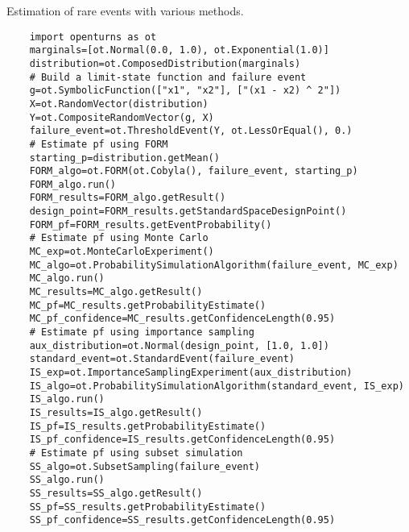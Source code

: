 \begin{otexample_apx}
    Estimation of rare events with various methods. 
    \lstset{style=mystyle, language=python}
%
\begin{lstlisting}
    import openturns as ot
    marginals=[ot.Normal(0.0, 1.0), ot.Exponential(1.0)]
    distribution=ot.ComposedDistribution(marginals)
    # Build a limit-state function and failure event
    g=ot.SymbolicFunction(["x1", "x2"], ["(x1 - x2) ^ 2"])
    X=ot.RandomVector(distribution)
    Y=ot.CompositeRandomVector(g, X)
    failure_event=ot.ThresholdEvent(Y, ot.LessOrEqual(), 0.)
    # Estimate pf using FORM
    starting_p=distribution.getMean()
    FORM_algo=ot.FORM(ot.Cobyla(), failure_event, starting_p)
    FORM_algo.run()
    FORM_results=FORM_algo.getResult()
    design_point=FORM_results.getStandardSpaceDesignPoint()
    FORM_pf=FORM_results.getEventProbability()
    # Estimate pf using Monte Carlo 
    MC_exp=ot.MonteCarloExperiment()
    MC_algo=ot.ProbabilitySimulationAlgorithm(failure_event, MC_exp)
    MC_algo.run()
    MC_results=MC_algo.getResult()
    MC_pf=MC_results.getProbabilityEstimate()
    MC_pf_confidence=MC_results.getConfidenceLength(0.95)
    # Estimate pf using importance sampling
    aux_distribution=ot.Normal(design_point, [1.0, 1.0])
    standard_event=ot.StandardEvent(failure_event)
    IS_exp=ot.ImportanceSamplingExperiment(aux_distribution)
    IS_algo=ot.ProbabilitySimulationAlgorithm(standard_event, IS_exp)
    IS_algo.run()
    IS_results=IS_algo.getResult()
    IS_pf=IS_results.getProbabilityEstimate()
    IS_pf_confidence=IS_results.getConfidenceLength(0.95)
    # Estimate pf using subset simulation
    SS_algo=ot.SubsetSampling(failure_event)
    SS_algo.run()
    SS_results=SS_algo.getResult()
    SS_pf=SS_results.getProbabilityEstimate()
    SS_pf_confidence=SS_results.getConfidenceLength(0.95)
\end{lstlisting}
%
\end{otexample_apx}


